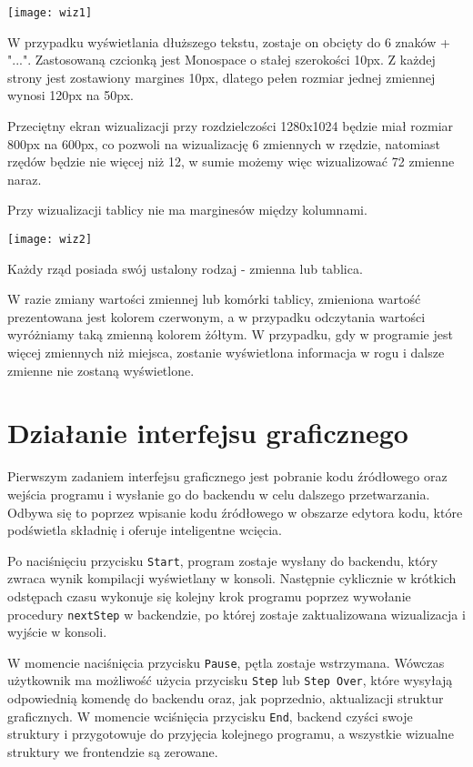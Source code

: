 \documentclass[a4paper,twoside,openright,11pt]{report}
\begin{document}
\begin{center}
  \texttt{[image: wiz1]}
\end{center}

\par W przypadku wyświetlania dłuższego tekstu, zostaje on obcięty do 6 znaków + "...".
Zastosowaną czcionką jest Monospace o stałej szerokości 10px. Z każdej strony jest zostawiony margines 10px, dlatego pełen rozmiar jednej zmiennej wynosi 120px na 50px.
\par Przeciętny ekran wizualizacji przy rozdzielczości 1280x1024 będzie miał rozmiar 800px na 600px, co pozwoli na wizualizację 6 zmiennych w rzędzie, natomiast rzędów będzie nie więcej niż 12, w sumie możemy więc wizualizować 72 zmienne naraz. 
\par Przy wizualizacji tablicy nie ma marginesów między kolumnami.

\begin{center}
  \texttt{[image: wiz2]}
\end{center}

\par Każdy rząd posiada swój ustalony rodzaj - zmienna lub tablica.
\par W razie zmiany wartości zmiennej lub komórki tablicy, zmieniona wartość prezentowana jest kolorem czerwonym, a w przypadku odczytania wartości wyróżniamy taką zmienną kolorem żółtym. W przypadku, gdy w programie jest więcej zmiennych niż miejsca, zostanie wyświetlona informacja w rogu i dalsze zmienne nie zostaną wyświetlone.

  \section{Działanie interfejsu graficznego}
\par Pierwszym zadaniem interfejsu graficznego jest pobranie kodu źródłowego oraz wejścia programu i wysłanie go do backendu w celu dalszego przetwarzania. Odbywa się to poprzez wpisanie kodu źródłowego w obszarze edytora kodu, które podświetla składnię i oferuje inteligentne wcięcia.
\par Po naciśnięciu przycisku \texttt{Start}, program zostaje wysłany do backendu, który zwraca wynik kompilacji wyświetlany w konsoli. Następnie cyklicznie w krótkich odstępach czasu wykonuje się kolejny krok programu poprzez wywołanie procedury \texttt{nextStep} w backendzie, po której zostaje zaktualizowana wizualizacja i wyjście w konsoli.
\par W momencie naciśnięcia przycisku \texttt{Pause}, pętla zostaje wstrzymana. Wówczas użytkownik ma możliwość użycia przycisku \texttt{Step} lub \texttt{Step Over}, które wysyłają odpowiednią komendę do backendu oraz, jak poprzednio, aktualizacji struktur graficznych. W momencie wciśnięcia przycisku \texttt{End}, backend czyści swoje struktury i przygotowuje do przyjęcia kolejnego programu, a wszystkie wizualne struktury we frontendzie są zerowane.
\end{document}
